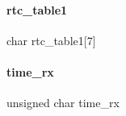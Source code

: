 \paragraph{rtc\+\_\+table1}
{\footnotesize\ttfamily char rtc\+\_\+table1[7]}

\mbox{\label{a00017_a878db895116fbbee698e727062540d31}} 
\paragraph{time\+\_\+rx}
{\footnotesize\ttfamily unsigned char time\+\_\+rx}

